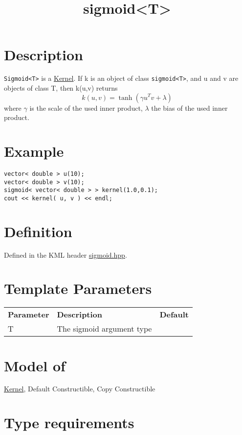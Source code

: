\documentclass{article}
\begin{document}
\title{sigmoid<T>}
\maketitle

\section*{Description}

\texttt{Sigmoid<T>} is a \href{research/kml/documentation/kernel.html}{Kernel}. If k is an object of class \texttt{sigmoid<T>}, and u and v are objects of class T, then k(u,v) returns
%
$$k(u,v) = \tanh( \gamma u^T v + \lambda)$$
%
where $\gamma$ is the scale of the used inner product, $\lambda$ the bias of the used inner product. 


\section*{Example}


\highlightcpp{}
\begin{verbatim}
vector< double > u(10);
vector< double > v(10);
sigmoid< vector< double > > kernel(1.0,0.1);
cout << kernel( u, v ) << endl;
\end{verbatim}


\section*{Definition}

Defined in the KML header \href{sigmoid.hpp}{sigmoid.hpp}.


\section*{Template Parameters}

\begin{tabular}{lll}
\textbf{Parameter} & \textbf{Description} & \textbf{Default} \\ 
T & The sigmoid argument type \\ 
\end{tabular}


\section*{Model of}

\href{research/kml/documentation/kernel.html}{Kernel},
Default Constructible, Copy Constructible


\section*{Type requirements}
\end{document}
